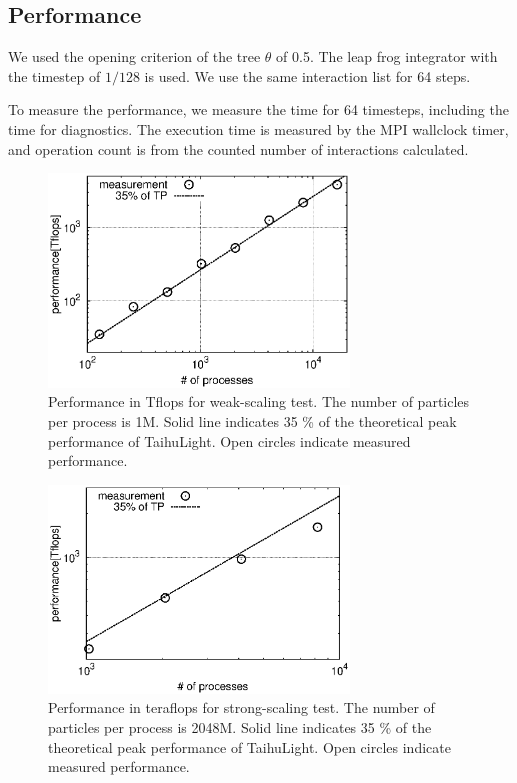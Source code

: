 \documentclass[oribibl]{llncs}
\begin{document}
\subsection{Performance}

We used the opening criterion of the tree $\theta$ of 0.5. The leap
frog integrator with the timestep of $1/128$ is used. We use the same
interaction list for 64 steps.

To measure the performance, we measure the time for 64 timesteps,
including the time for diagnostics. The execution time is measured by
the MPI wallclock timer, and operation count is from the counted
number of interactions calculated.


\begin{figure}
  \centering
    \includegraphics[width=8cm,clip]{./fig/weak_speed.eps}
  \caption{Performance in Tflops for weak-scaling test. The number
    of particles per process is 1M. Solid line indicates 35 \% of the
    theoretical peak performance of TaihuLight. Open circles indicate
    measured performance.}
  \label{fig:weakpf}
\end{figure}

\begin{figure}
  \begin{center}
    \includegraphics[width=8cm,clip]{./fig/strong_speed.eps}
  \end{center}
  \caption{Performance in teraflops for strong-scaling test. The
    number of particles per process is 2048M. Solid line indicates 35
    \% of the theoretical peak performance of TaihuLight. Open circles
    indicate measured performance.}
  \label{fig:strongpf}
\end{figure}
\end{document}
